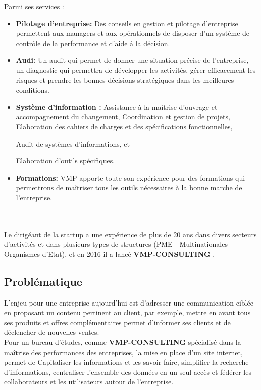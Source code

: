 \documentclass[12pt]{article}
\begin{document}
Parmi ses services :
\begin{itemize}

\item \textbf{Pilotage d'entreprise: } Des conseils en gestion et pilotage d'entreprise permettent aux managers et aux opérationnels de disposer d’un système de contrôle de la performance et d’aide à la décision.


\item \textbf{Audi: } Un audit qui permet de donner une situation précise de l'entreprise, un
diagnostic qui  permettra de développer les activités, gérer efficacement les risques et prendre les bonnes décisions stratégiques dans les meilleures conditions.


\item \textbf{Système d'information : }  Assistance à la maîtrise d’ouvrage et accompagnement du changement,
 Coordination et gestion de projets, 
 Elaboration des cahiers de charges et des spécifications fonctionnelles, 

 Audit de systèmes d’informations, et

Elaboration d’outils spécifiques.


\item \textbf{Formations: } VMP apporte toute son expérience pour des formations qui permettrons de maîtriser tous les outils nécessaires à la bonne marche de l'entreprise.
\end{itemize}
\\ \\ 



Le dirigéant de la startup a une expérience de plus de 20 ans dans divers secteurs d'activités et dans plusieurs types de structures (PME - Multinationales - Organismes d'Etat), et en 2016 il a lancé       \textbf{VMP-CONSULTING} .



 \subsection{Problématique}

L’enjeu pour une entreprise aujourd'hui est d’adresser une communication ciblée en proposant un contenu pertinent au client, par exemple, mettre en avant tous ses produits et offres complémentaires permet d’informer ses clients et de déclencher de nouvelles ventes. \\ 
Pour un bureau d’études, comme \textbf{VMP-CONSULTING}  spécialisé dans la maîtrise des performances des entreprises, la mise en place d'un site internet,  permet de  Capitaliser les informations et les savoir-faire,
    simplifier la recherche d’informations,
    centraliser l’ensemble des données en un seul accès et
    fédérer les collaborateurs et les utilisateurs autour de l’entreprise.
\\ \\
\end{document}
